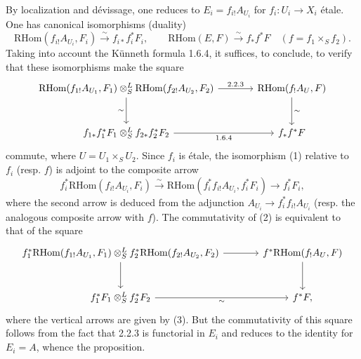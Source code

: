 \documentclass[11pt]{article}
\providecommand{\RHom}{\mathrm{RHom}}
\providecommand{\RHom}{\mathrm{RHom}}
\providecommand{\RHom}{\mathrm R\mathcal{H}om}
\providecommand{\RHom}{\mathrm{RHom}}
\begin{document}
By localization and dévissage, one reduces to $E_i=f_{i!}A_{U_i}$ for $f_i:U_i\to X_i$ étale. One has canonical isomorphisms (duality)
\begin{equation}\tag{1}
\RHom(f_{i!}A_{U_i},F_i)\xrightarrow{\sim}f_{i*}f_i^{*}F_i,
\qquad
\RHom(E,F)\xrightarrow{\sim}f_{*}f^{*}F\quad(f=f_1\times_S f_2).
\end{equation}
Taking into account the Künneth formula 1.6.4, it suffices, to conclude, to verify that these isomorphisms make the square
\[
\begin{tikzcd}[column sep=large,row sep=large]
\RHom(f_{1!}A_{U_1},F_1)\otimes^{L}_{S}\RHom(f_{2!}A_{U_2},F_2) \arrow[r,"2.2.3"] \arrow[d,"\sim"'] & \RHom(f_{!}A_U,F) \arrow[d,"\sim"]\\
f_{1*}f_1^{*}F_1\otimes^{L}_{S}f_{2*}f_2^{*}F_2 \arrow[r,"1.6.4"'] & f_{*}f^{*}F
\end{tikzcd}
\]
commute, where $U=U_1\times_SU_2$. Since $f_i$ is étale, the isomorphism (1) relative to $f_i$ (resp. $f$) is adjoint to the composite arrow
\begin{equation}\tag{3}
f_i^{*}\RHom(f_{i!}A_{U_i},F_i)\xrightarrow{\sim}\RHom(f_i^{*}f_{i!}A_{U_i},f_i^{*}F_i)\longrightarrow f_i^{*}F_i,
\end{equation}
where the second arrow is deduced from the adjunction $A_{U_i}\to f_i^{*}f_{i!}A_{U_i}$ (resp. the analogous composite arrow with $f$). The commutativity of (2) is equivalent to that of the square
\[
\begin{tikzcd}[column sep=large,row sep=large]
f_1^{*}\RHom(f_{1!}A_{U_1},F_1)\otimes^{L}_{S}f_2^{*}\RHom(f_{2!}A_{U_2},F_2) \arrow[r] \arrow[d] & f^{*}\RHom(f_{!}A_U,F) \arrow[d]\\
f_1^{*}F_1\otimes^{L}_{S}f_2^{*}F_2 \arrow[r,"\sim"'] & f^{*}F,
\end{tikzcd}
\]
where the vertical arrows are given by (3). But the commutativity of this square follows from the fact that 2.2.3 is functorial in $E_i$ and reduces to the identity for $E_i=A$, whence the proposition.
\end{document}
